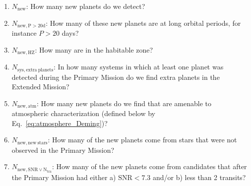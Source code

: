 \begin{enumerate}
	\item $N_\mathrm{new}$: How many new planets do we detect?
	\item $N_\mathrm{new,P>20d}$: How many of these new planets are at long orbital periods, for instance $P>20$ days?
	\item $N_\mathrm{new,HZ}$: How many are in the habitable zone?
	\item $N_\mathrm{sys,extra\ planets}$: In how many systems in which at least one planet was detected during the Primary Mission do we find extra planets in the Extended Mission?
	\item $N_\mathrm{new,atm}$: How many new planets do we find that are amenable to atmospheric characterization (defined below by Eq.~\ref{eq:atmosphere_Deming})?
	\item $N_\mathrm{new,new\ stars}$: How many of the new planets come from 
	stars that were not observed in the Primary Mission? 
	\item $N_\mathrm{new,SNR\lor N_{tra}}$: How many of the new planets come 
	from candidates that after the Primary Mission had either a) 
	$\mathrm{SNR}<7.3$ and/or b) less than 2 transits?
\end{enumerate}
